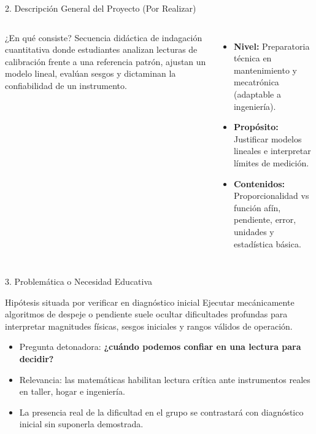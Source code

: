 \documentclass[aspectratio=169,spanish,xcolor=table]{beamer}
\begin{document}
\begin{frame}{2. Descripción General del Proyecto (Por Realizar)}
  \begin{columns}[T]
      \begin{block}{¿En qué consiste?}
        Secuencia didáctica de indagación cuantitativa donde estudiantes analizan lecturas de calibración frente a una referencia patrón, ajustan un modelo lineal, evalúan sesgos y dictaminan la confiabilidad de un instrumento.
      \end{block}
      \begin{itemize}\scriptsize
        \item \textbf{Nivel:} Preparatoria técnica en mantenimiento y mecatrónica (adaptable a ingeniería).
        \item \textbf{Propósito:} Justificar modelos lineales e interpretar límites de medición.
        \item \textbf{Contenidos:} Proporcionalidad vs función afín, pendiente, error, unidades y estadística básica.
      \end{itemize}
  \end{columns}
\end{frame}

\begin{frame}{3. Problemática o Necesidad Educativa}
  \begin{block}{Hipótesis situada por verificar en diagnóstico inicial}
    Ejecutar mecánicamente algoritmos de despeje o pendiente suele ocultar dificultades profundas para interpretar magnitudes físicas, sesgos iniciales y rangos válidos de operación.
  \end{block}
  \vspace{0.25cm}
  \begin{itemize}\small
    \item Pregunta detonadora: \textbf{\color{iiiepeNavy}¿cuándo podemos confiar en una lectura para decidir?}
    \item Relevancia: las matemáticas habilitan lectura crítica ante instrumentos reales en taller, hogar e ingeniería.
    \item La presencia real de la dificultad en el grupo se contrastará con diagnóstico inicial sin suponerla demostrada.
  \end{itemize}
\end{frame}
\end{document}
